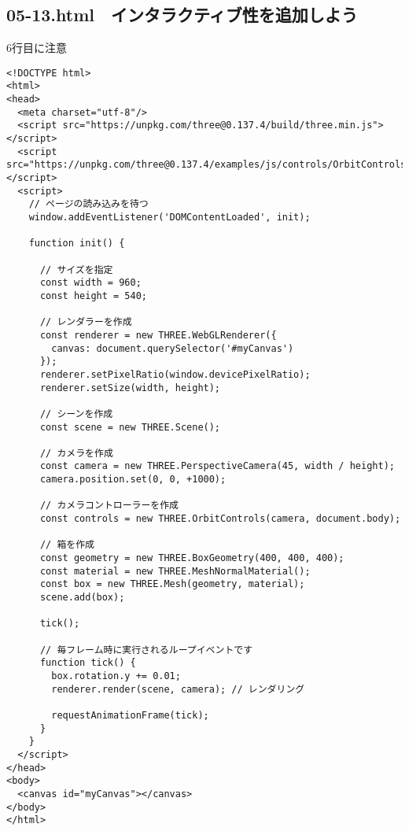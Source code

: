 \documentclass[mingoth,11pt,a4j,uplatex]{jsarticle}
\begin{document}
\subsection{05-13.html　インタラクティブ性を追加しよう}
6行目に注意
\begin{lstlisting}[caption=05-13.html]
<!DOCTYPE html>
<html>
<head>
  <meta charset="utf-8"/>
  <script src="https://unpkg.com/three@0.137.4/build/three.min.js"></script>
  <script src="https://unpkg.com/three@0.137.4/examples/js/controls/OrbitControls.js"></script>
  <script>
    // ページの読み込みを待つ
    window.addEventListener('DOMContentLoaded', init);

    function init() {

      // サイズを指定
      const width = 960;
      const height = 540;

      // レンダラーを作成
      const renderer = new THREE.WebGLRenderer({
        canvas: document.querySelector('#myCanvas')
      });
      renderer.setPixelRatio(window.devicePixelRatio);
      renderer.setSize(width, height);

      // シーンを作成
      const scene = new THREE.Scene();

      // カメラを作成
      const camera = new THREE.PerspectiveCamera(45, width / height);
      camera.position.set(0, 0, +1000);

      // カメラコントローラーを作成
      const controls = new THREE.OrbitControls(camera, document.body);

      // 箱を作成
      const geometry = new THREE.BoxGeometry(400, 400, 400);
      const material = new THREE.MeshNormalMaterial();
      const box = new THREE.Mesh(geometry, material);
      scene.add(box);

      tick();

      // 毎フレーム時に実行されるループイベントです
      function tick() {
        box.rotation.y += 0.01;
        renderer.render(scene, camera); // レンダリング

        requestAnimationFrame(tick);
      }
    }
  </script>
</head>
<body>
  <canvas id="myCanvas"></canvas>
</body>
</html>
\end{lstlisting}
\end{document}
